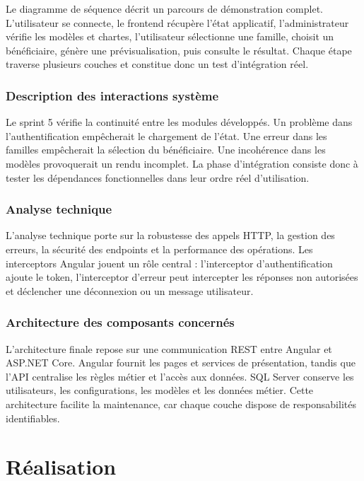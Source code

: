 Le diagramme de séquence décrit un parcours de démonstration complet. L'utilisateur se connecte, le frontend récupère l'état applicatif, l'administrateur vérifie les modèles et chartes, l'utilisateur sélectionne une famille, choisit un bénéficiaire, génère une prévisualisation, puis consulte le résultat. Chaque étape traverse plusieurs couches et constitue donc un test d'intégration réel.

\subsubsection*{Description des interactions système}

Le sprint 5 vérifie la continuité entre les modules développés. Un problème dans l'authentification empêcherait le chargement de l'état. Une erreur dans les familles empêcherait la sélection du bénéficiaire. Une incohérence dans les modèles provoquerait un rendu incomplet. La phase d'intégration consiste donc à tester les dépendances fonctionnelles dans leur ordre réel d'utilisation.

\subsubsection*{Analyse technique}

L'analyse technique porte sur la robustesse des appels HTTP, la gestion des erreurs, la sécurité des endpoints et la performance des opérations. Les interceptors Angular jouent un rôle central : l'interceptor d'authentification ajoute le token, l'interceptor d'erreur peut intercepter les réponses non autorisées et déclencher une déconnexion ou un message utilisateur.

\subsubsection*{Architecture des composants concernés}

L'architecture finale repose sur une communication REST entre Angular et ASP.NET Core. Angular fournit les pages et services de présentation, tandis que l'API centralise les règles métier et l'accès aux données. SQL Server conserve les utilisateurs, les configurations, les modèles et les données métier. Cette architecture facilite la maintenance, car chaque couche dispose de responsabilités identifiables.

\section{Réalisation}

